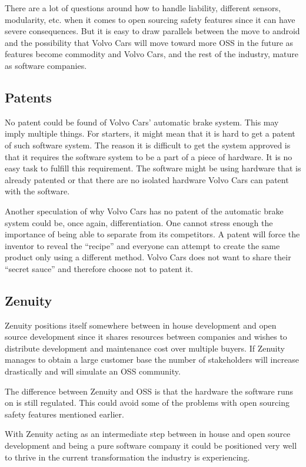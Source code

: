 \documentclass[conference]{IEEEtran}
\begin{document}
There are a lot of questions around how to handle liability, different sensors, modularity, etc. when it comes to open sourcing safety features since it can have severe consequences. But it is easy to draw parallels between the move to android and the possibility that Volvo Cars will move toward more OSS in the future as features become commodity and Volvo Cars, and the rest of the industry, mature as software companies.

\subsection{Patents}
No patent could be found of Volvo Cars' automatic brake system. This may imply multiple things. For starters, it might mean that it is hard to get a patent of such software system. The reason it is difficult to get the system approved is that it requires the software system to be a part of a piece of hardware. It is no easy task to fulfill this requirement. The software might be using hardware that is already patented or that there are no isolated hardware Volvo Cars can patent with the software. 

Another speculation of why Volvo Cars has no patent of the automatic brake system could be, once again, differentiation. One cannot stress enough the importance of being able to separate from its competitors. A patent will force the inventor to reveal the ``recipe'' and everyone can attempt to create the same product only using a different method. Volvo Cars does not want to share their ``secret sauce'' and therefore choose not to patent it. \cite{SoftwarePatent}

\subsection{Zenuity}
Zenuity positions itself somewhere between in house development and open source development since it shares resources between companies and wishes to distribute development and maintenance cost over multiple buyers. If Zenuity manages to obtain a large customer base the number of stakeholders will increase drastically and will simulate an OSS community.

The difference between Zenuity and OSS is that the hardware the software runs on is still regulated. This could avoid some of the problems with open sourcing safety features mentioned earlier.

With Zenuity acting as an intermediate step between in house and open source development and being a pure software company it could be positioned very well to thrive in the current transformation the industry is experiencing.
\end{document}
